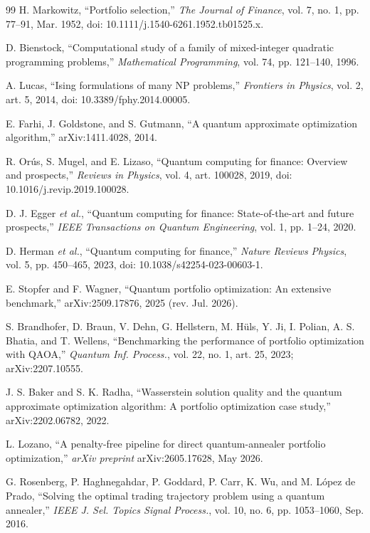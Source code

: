 \documentclass{ieeeaccess}
\begin{document}
\begin{thebibliography}{99}
 H. Markowitz, ``Portfolio selection,'' \textit{The Journal of Finance}, vol. 7, no. 1, pp. 77--91, Mar. 1952, doi: 10.1111/j.1540-6261.1952.tb01525.x.

 D. Bienstock, ``Computational study of a family of mixed-integer quadratic programming problems,'' \textit{Mathematical Programming}, vol. 74, pp. 121--140, 1996.

 A. Lucas, ``Ising formulations of many NP problems,'' \textit{Frontiers in Physics}, vol. 2, art. 5, 2014, doi: 10.3389/fphy.2014.00005.

 E. Farhi, J. Goldstone, and S. Gutmann, ``A quantum approximate optimization algorithm,'' arXiv:1411.4028, 2014.

 R. Or\'{u}s, S. Mugel, and E. Lizaso, ``Quantum computing for finance: Overview and prospects,'' \textit{Reviews in Physics}, vol. 4, art. 100028, 2019, doi: 10.1016/j.revip.2019.100028.

 D. J. Egger \textit{et al.}, ``Quantum computing for finance: State-of-the-art and future prospects,'' \textit{IEEE Transactions on Quantum Engineering}, vol. 1, pp. 1--24, 2020.

 D. Herman \textit{et al.}, ``Quantum computing for finance,'' \textit{Nature Reviews Physics}, vol. 5, pp. 450--465, 2023, doi: 10.1038/s42254-023-00603-1.

 E. Stopfer and F. Wagner, ``Quantum portfolio optimization: An extensive benchmark,'' arXiv:2509.17876, 2025 (rev. Jul. 2026).

 S. Brandhofer, D. Braun, V. Dehn, G. Hellstern, M. H\"{u}ls, Y. Ji, I. Polian, A. S. Bhatia, and T. Wellens, ``Benchmarking the performance of portfolio optimization with QAOA,'' \textit{Quantum Inf. Process.}, vol. 22, no. 1, art. 25, 2023; arXiv:2207.10555.

 J. S. Baker and S. K. Radha, ``Wasserstein solution quality and the quantum approximate optimization algorithm: A portfolio optimization case study,'' arXiv:2202.06782, 2022.

 L. Lozano, ``A penalty-free pipeline for direct quantum-annealer portfolio optimization,'' \textit{arXiv preprint} arXiv:2605.17628, May 2026.

 G. Rosenberg, P. Haghnegahdar, P. Goddard, P. Carr, K. Wu, and M. L\'{o}pez de Prado, ``Solving the optimal trading trajectory problem using a quantum annealer,'' \textit{IEEE J. Sel. Topics Signal Process.}, vol. 10, no. 6, pp. 1053--1060, Sep. 2016.


\end{thebibliography}
\end{document}
